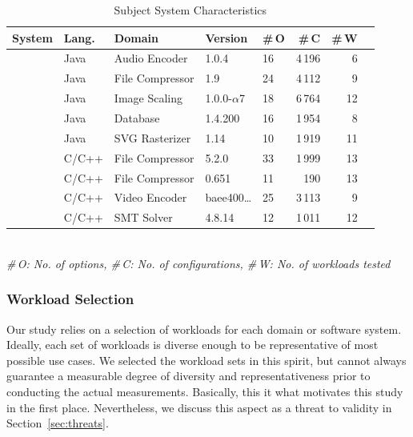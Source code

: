 {{\begin{table}
	\footnotesize
	\centering
	\caption{Subject System Characteristics}
	

\begin{tabular}{p{1.1cm}p{0.6cm}p{1.9cm}p{0.99cm}p{0.2cm}rrr}
	\toprule
	\textbf{System} & \textbf{Lang.} & \textbf{Domain} & \textbf{Version} & \textbf{\#\,O} & \textbf{\#\,C} & \textbf{\#\,W}  \\
	
	
	\midrule
	\jumper & Java & Audio Encoder & 1.0.4 & 16 & 4\,196 & 6   \\
	
	\kanzi &Java  & File Compressor & 1.9 & 24 & 4\,112 & 9 \\
	
	\dconvert & Java & Image Scaling & 1.0.0-$\alpha$7 & 18 & 6\,764 & 12  \\
	
	\htwo & Java & Database & 1.4.200 & 16 & 1\,954  & 8  \\
	
	\batik & Java & SVG Rasterizer & 1.14 & 10 & 1\,919 &  11  \\

	\midrule
	
	\xz & C/C++ & File Compressor & 5.2.0 & 33 & 1\,999 & 13  \\
	\lrzip & C/C++ & File Compressor & 0.651 & 11 & 190 & 13  \\
	
	\xzwo & C/C++ & Video Encoder & baee400\ldots & 25 & 3\,113 & 9  \\
	\zdrei & C/C++ & SMT Solver & 4.8.14 & 12 & 1\,011 & 12  \\
	
	\bottomrule
	
\end{tabular}\\
{\centering\vspace{1mm}\textit{\#\,O: No. of options, \#\,C: No. of configurations, \#\,W: No. of workloads tested}}
	

	\label{tab:subject_systems}
\end{table}

\subsubsection{Workload Selection}
Our study relies on a selection of workloads for each domain or software system. Ideally, each set of workloads is diverse enough to be representative of most possible use cases. We selected the workload sets in this spirit, but cannot always guarantee a measurable degree of diversity and representativeness prior to conducting the actual measurements. Basically, this it what motivates this study in the first place. Nevertheless, we discuss this aspect as a threat to validity in Section~\ref{sec:threats}. 

}}
